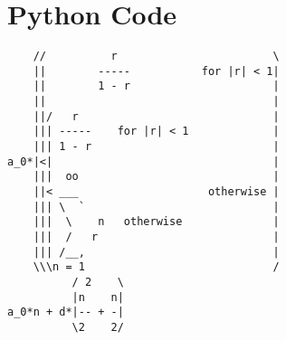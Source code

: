 \section{Python Code}\label{A:python-1}

\begin{notepad}\scriptsize
\begin{verbatim}
    //          r                        \
    ||        -----           for |r| < 1|
    ||        1 - r                      |
    ||                                   |
    ||/   r                              |
    ||| -----    for |r| < 1             |
    ||| 1 - r                            |
a_0*|<|                                  |
    |||  oo                              |
    ||< ___                    otherwise |
    ||| \  `                             |
    |||  \    n   otherwise              |
    |||  /   r                           |
    ||| /__,                             |
    \\\n = 1                             /
          / 2    \
          |n    n|
a_0*n + d*|-- + -|
          \2    2/
\end{verbatim}
\end{notepad}
